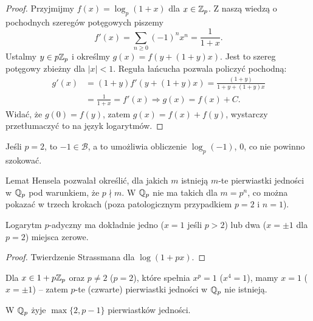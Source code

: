 \begin{proof}
	Przyjmijmy $f(x) = \log_p(1+x)$ dla $x \in \mathbb Z_p$.
	Z naszą wiedzą o pochodnych szeregów potęgowych piszemy
	\[
		f'(x) = \sum_{n \ge 0} (-1)^nx^n = \frac{1}{1+x}.
	\]
	Ustalmy $y \in p\mathbb Z_p$ i określmy $g(x) = f(y + (1+y)x)$.
	Jest to szereg potęgowy zbieżny dla $|x| < 1$.
	Reguła łańcucha pozwala policzyć pochodną:
	\begin{align*}
		g'(x) & = (1+y) f'(y + (1+y)x) = \frac{(1+y)}{1+y + (1+y)x} \\
		& = \frac{1}{1+x} = f'(x) \Rightarrow g(x) = f(x) + C.
	\end{align*}
	Widać, że $g(0) = f(y)$, zatem $g(x) = f(x) + f(y)$, wystarczy przetłumaczyć to na język logarytmów.
\end{proof}

Jeśli $p = 2$, to $-1 \in \mathcal B$, a to umożliwia obliczenie $\log_p(-1)$, $0$, co nie powinno szokować.

Lemat Hensela pozwalał określić, dla jakich $m$ istnieją $m$-te pierwiastki jedności w $\mathbb Q_p$ pod warunkiem, że $p \nmid m$.
W $\mathbb Q_p$ nie ma takich dla $m = p^n$, co można pokazać w trzech krokach (poza patologicznym przypadkiem $p = 2$ i $n = 1$).

\begin{fakt}
	Logarytm $p$-adyczny ma dokładnie jedno ($x = 1$ jeśli $p > 2$) lub dwa ($x = \pm 1$ dla $p = 2$) miejsca zerowe.
\end{fakt}

\begin{proof}
	Twierdzenie Strassmana dla $\log(1+px)$.
\end{proof}

\begin{wniosek}
	Dla $x \in 1 + p\mathbb Z_p$ oraz $p \neq 2$ ($p = 2$), które spełnia $x^p = 1$ ($x^4 = 1$), mamy $x = 1$ ($x = \pm 1$) -- zatem $p$-te (czwarte) pierwiastki jedności w $\mathbb Q_p$ nie istnieją.
\end{wniosek}

\begin{wniosek}
	W $\mathbb Q_p$ żyje $\max\{2, p - 1\}$ pierwiastków jedności.
\end{wniosek}